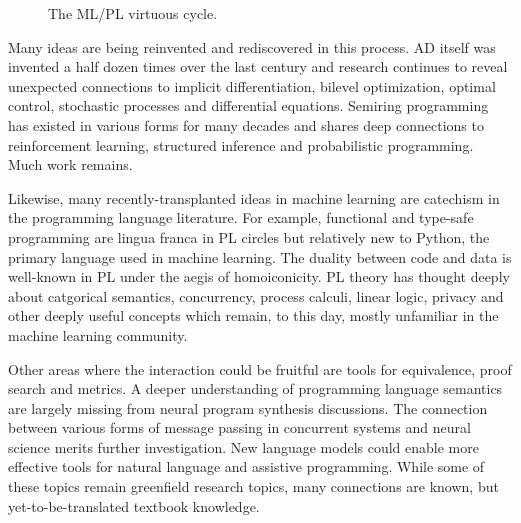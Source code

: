 \documentclass{article}
\begin{document}
    \begin{figure}[H]
        \centering
        \caption{The ML/PL virtuous cycle.}
    \end{figure}

    Many ideas are being reinvented and rediscovered in this process. AD itself was invented a half dozen times over the last century and research continues to reveal unexpected connections to implicit differentiation, bilevel optimization, optimal control, stochastic processes and differential equations. Semiring programming has existed in various forms for many decades and shares deep connections to reinforcement learning, structured inference and probabilistic programming. Much work remains.

    Likewise, many recently-transplanted ideas in machine learning are catechism in the programming language literature. For example, functional and type-safe programming are lingua franca in PL circles but relatively new to Python, the primary language used in machine learning. The duality between code and data is well-known in PL under the aegis of homoiconicity. PL theory has thought deeply about catgorical semantics, concurrency, process calculi, linear logic, privacy and other deeply useful concepts which remain, to this day, mostly unfamiliar in the machine learning community.


    Other areas where the interaction could be fruitful are tools for equivalence, proof search and metrics. A deeper understanding of programming language semantics are largely missing from neural program synthesis discussions. The connection between various forms of message passing in concurrent systems and neural science merits further investigation. New language models could enable more effective tools for natural language and assistive programming. While some of these topics remain greenfield research topics, many connections are known, but yet-to-be-translated textbook knowledge.
\end{document}
